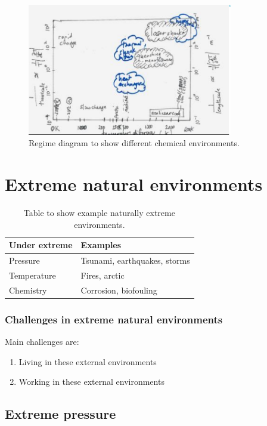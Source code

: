 \begin{figure}[htbp]
    \centering
    \includegraphics[width = 0.8\textwidth]{./img/figure79.png}
    \caption{Regime diagram to show different chemical environments.}
    \label{regimeDiagram3}
\end{figure}
\section{Extreme natural environments}
\begin{table}[htbp]
    \centering
    \begin{tabular}{@{}ll@{}}
        \toprule
        \textbf{Under extreme} & \textbf{Examples}            \\
        \midrule
        Pressure               & Tsunami, earthquakes, storms \\
        Temperature            & Fires, arctic                \\
        Chemistry              & Corrosion, biofouling        \\
        \bottomrule
    \end{tabular}
    \caption{Table to show example naturally extreme environments.}
\end{table}
\subsubsection{Challenges in extreme natural environments}
Main challenges are:
\begin{enumerate}
    \item Living in these external environments
    \item Working in these external environments
\end{enumerate}
\subsection{Extreme pressure}
